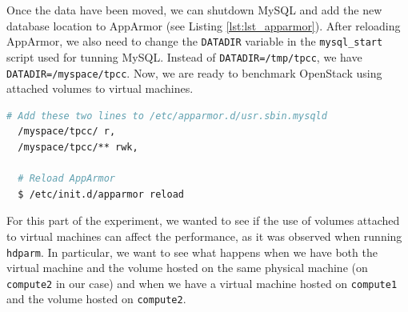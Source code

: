 Once the data have been moved, we can shutdown MySQL and add the new database location to AppArmor (see Listing \ref{lst:lst_apparmor}). 
After reloading AppArmor, we also need to change the \texttt{DATADIR} variable in the \texttt{mysql\_start} script used for tunning MySQL. 
Instead of \texttt{DATADIR=/tmp/tpcc}, we have \texttt{DATADIR=/myspace/tpcc}. 
Now, we are ready to benchmark OpenStack using attached volumes to virtual machines.

{
\singlespacing
\begin{lstlisting}[frame=single,language=bash,caption={Configure AppArmor},label={lst:lst_apparmor}]
  # Add these two lines to /etc/apparmor.d/usr.sbin.mysqld
  /myspace/tpcc/ r,
  /myspace/tpcc/** rwk,

  # Reload AppArmor
  $ /etc/init.d/apparmor reload
\end{lstlisting}
}

For this part of the experiment, we wanted to see if the use of volumes attached to virtual machines can affect the performance, as it was observed when running \texttt{hdparm}. 
In particular, we want to see what happens when we have both the virtual machine and the volume hosted on the same physical machine (on \texttt{compute2} in our case) and when we have a virtual machine hosted on \texttt{compute1} and the volume hosted on \texttt{compute2}.

